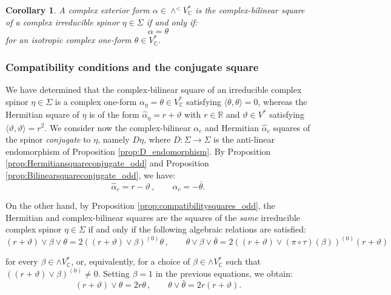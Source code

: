 \documentclass[10pt,a4paper,twoside,reqno]{amsart}
\theoremstyle{plain}
\newtheorem{cor}[thm]{Corollary}
\theoremstyle{definition}
\theoremstyle{remark}
\def\C{\mathbb{C}}
\def\R{\mathbb{R}}
\def\R{\mathbb{R}}
\newcommand{\escal}[1]{\langle#1\rangle}
\begin{document}
\begin{cor}
A complex exterior form $\alpha\in\wedge^< V^*_\C$ is the complex-bilinear square of a complex irreducible spinor $\eta\in\Sigma$ if and only if: $$\alpha=\theta$$ for an isotropic complex one-form $\theta\in V^{\ast}_{\C}$.
\end{cor}


\subsubsection{Compatibility conditions and the conjugate square}


We have determined that the complex-bilinear square of an irreducible complex spinor $\eta\in\Sigma$ is a complex one-form $\alpha_\eta=\theta\in V^*_\C$ satisfying $\escal{\theta,\theta}=0$, whereas the Hermitian square of $\eta$ is of the form $\widehat{\alpha}_\eta=r+\vartheta$ with $r\in\R$ and $\vartheta\in V^*$ satisfying $\escal{\vartheta,\vartheta}=r^2$. We consider now the complex-bilinear $\alpha_c$ and Hermitian $\widehat{\alpha}_c$ squares of the spinor \emph{conjugate} to $\eta$, namely $D\eta$, where $D\colon\Sigma\to\Sigma$ is the anti-linear endomorphism of Proposition \ref{prop:D_endomorphism}. By Proposition \ref{prop:Hermitiansquareconjugate_odd} and Proposition \ref{prop:Bilinearsquareconjugate_odd}, we have:
\begin{equation*}
\widehat{\alpha}_c = r - \vartheta\, , \qquad \alpha_c = - \bar{\theta}.
\end{equation*}

\noindent
On the other hand, by Proposition \ref{prop:compatibilitysquares_odd}, the Hermitian and complex-bilinear squares are the squares of the \emph{same} irreducible complex spinor $\eta\in \Sigma$ if and only if the following algebraic relations are satisfied:
\begin{equation*}  
(r + \vartheta) \vee \beta \vee \theta  = 2  ((r + \vartheta) \vee \beta)^{(0)} \theta \, , \qquad    \theta \vee \beta \vee \bar{\theta} = 2    ((r + \vartheta)\vee (\pi \circ \tau)(\beta))^{(0)}  (r + \vartheta)
\end{equation*}

\noindent
for every $\beta \in \wedge V^{\ast}_{\C}$, or, equivalently, for a choice of $\beta \in \wedge V^{\ast}_{\C}$ such that $((r + \vartheta) \vee \beta)^{(0)} \neq 0$. Setting $\beta = 1$ in the previous equations, we obtain: 
\begin{equation*}  
(r + \vartheta)  \vee \theta  = 2  r  \theta \, , \qquad    \theta  \vee \bar{\theta} = 2    r    (r + \vartheta).
\end{equation*}
 
\end{document}
